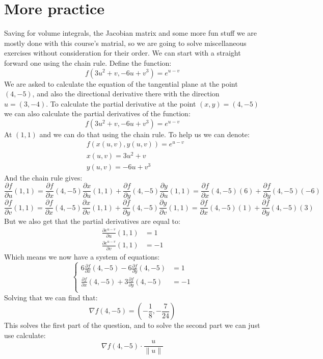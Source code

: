\documentclass{article}
\theoremstyle{plain}
\begin{document}
	\section{More practice}
	Saving for volume integrals, the Jacobian matrix and some more fun stuff
	we are mostly done with this course's matrial, so we are going to
	solve miscellaneous exercises without consideration for their order.
	We can start with a straight forward one using the chain rule. 
	\newpage
	Define the function:
	\[
		f(3u^2 + v, -6u + v^3) = e^{u-v}
	\]
	We are asked to calculate the equation of the tangential plane at the
	point $(4,-5)$, and also the directional derivative there with the 
	direction $u = (3,-4)$. To calculate the partial derivative at the
	point $(x,y) = (4,-5)$ we can also calculate the partial derivatives
	of the function:
	\[
		f(3u^2 + v, -6u + v^3) = e^{u-v}
	\]
	At $(1,1)$ and we can do that using the chain rule. To help us
	we can denote:
	\begin{align*}
		&f(x(u,v),y(u,v)) = e^{u-v} \\
		&x(u,v) = 3u^2 + v \\
		&y(u,v) = -6u + v^3
	\end{align*}
	And the chain rule gives:
	\[
		\frac{\partial f}{\partial u}(1,1) =
		\frac{\partial f}{\partial x}(4,-5)
		\frac{\partial x}{\partial u}(1,1) + 
		\frac{\partial f}{\partial y}(4,-5)
		\frac{\partial y}{\partial u}(1,1) =
		\frac{\partial f}{\partial x}(4,-5)
		(6) + 
		\frac{\partial f}{\partial y}(4,-5)
		(-6)
	\]
	\[
		\frac{\partial f}{\partial v}(1,1) =
		\frac{\partial f}{\partial x}(4,-5)
		\frac{\partial x}{\partial v}(1,1) + 
		\frac{\partial f}{\partial y}(4,-5)
		\frac{\partial y}{\partial v}(1,1) =
		\frac{\partial f}{\partial x}(4,-5)
		(1) + 
		\frac{\partial f}{\partial y}(4,-5)
		(3)
	\]
	But we also get that the partial derivatives are equal to:
	\begin{align*}
		\frac{\partial e^{u-v}}{\partial u}(1,1) &= 1 \\
		\frac{\partial e^{u-v}}{\partial v}(1,1) &= -1
	\end{align*}
	Which means we now have a system of equations:
	\[
	\begin{cases}
		6\frac{\partial f}{\partial x}(4,-5) -
		6\frac{\partial f}{\partial y}(4,-5) &= 1 \\
		\frac{\partial f}{\partial x}(4,-5) + 
		3\frac{\partial f}{\partial y}(4,-5) &= -1 \\
	\end{cases}
	\]
	Solving that we can find that:
	\[
		\nabla f(4, -5) = \left( -\frac 18, -\frac{7}{24} \right)
	\]
	This solves the first part of the question, and to solve the second
	part we can just use calculate:
	\[
		\nabla f(4,-5) \cdot \frac{u}{\|u\|}
	\]
	
\end{document}
